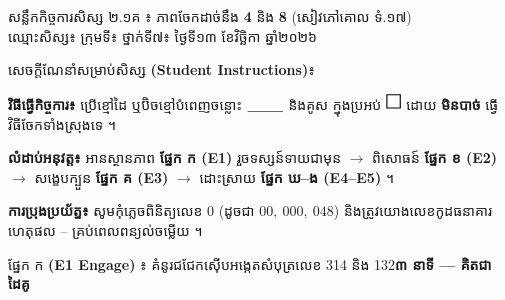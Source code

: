 \documentclass[10pt,a4paper]{article}
\newcommand{\en}[1]{{\LatinFont #1}}
\newcommand{\enbf}[1]{{\LatinFont\textbf{#1}}}
\newcommand{\cnum}[1]{{\fontsize{10pt}{11pt}\selectfont\ding{\numexpr181+#1\relax}}\hspace{0.15em}}
\newcommand{\blank}[1]{\underline{\hspace{#1}}}
\newcommand{\chkbox}{\tikz[baseline=-0.3ex]\draw[black,line width=0.8pt] (0,0) rectangle (0.33,0.33);}
\newcommand{\secbox}[2]{%
  \vspace{6pt}%
  \noindent\begin{tcolorbox}[
    enhanced, sharp corners, boxrule=0.9pt, colframe=black, colback=headband,
    left=7pt, right=7pt, top=4pt, bottom=4pt, boxsep=1pt
  ]
    {\muol\fontsize{9.8pt}{14pt}\selectfont #1}\hfill{\fontsize{9.0pt}{12.5pt}\selectfont\textbf{#2}}
  \end{tcolorbox}%
  \vspace{4pt}%
}
\begin{document}
\fontsize{9.7pt}{14.6pt}\selectfont

\begin{tcolorbox}[
  enhanced, sharp corners, colback=white, colframe=black, boxrule=1.05pt,
  left=8pt, right=8pt, top=5pt, bottom=5pt, boxsep=1pt
]
  {\muol\fontsize{10.5pt}{15pt}\selectfont សន្លឹកកិច្ចការសិស្ស ២.១គ ៖ ភាពចែកដាច់នឹង \enbf{4} និង \enbf{8} (សៀវភៅគោល ទំ.១៧)}\\[4pt]
  ឈ្មោះសិស្ស៖ \blank{5.2cm} \quad ក្រុមទី៖ \blank{1.6cm} \quad ថ្នាក់ទី៧៖ \blank{1.6cm} \quad ថ្ងៃទី១៣ ខែវិច្ឆិកា ឆ្នាំ២០២៦
\end{tcolorbox}

\vspace{5pt}
\begin{tcolorbox}[
  enhanced, sharp corners, colback=panelgray, colframe=black, boxrule=0.85pt,
  left=7pt, right=7pt, top=5pt, bottom=5pt, boxsep=1pt
]
  {\muol\fontsize{9.5pt}{13.8pt}\selectfont សេចក្ដីណែនាំសម្រាប់សិស្ស \enbf{(Student Instructions)}៖}
  \begin{wlist}
    \item \textbf{វិធីធ្វើកិច្ចការ៖} ប្រើខ្មៅដៃ ឬប៊ិចខ្មៅបំពេញចន្លោះ $\blank{0.9cm}$ និងគូស  ក្នុងប្រអប់ $\chkbox$ ដោយ \textbf{មិនបាច់} ធ្វើវិធីចែកទាំងស្រុងទេ ។
    \item \textbf{លំដាប់អនុវត្ត៖} អានស្ថានភាព \textbf{ផ្នែក ក (E1)} រួចទស្សន៍ទាយជាមុន $\to$ ពិសោធន៍ \textbf{ផ្នែក ខ (E2)} $\to$ សង្ខេបក្បួន \textbf{ផ្នែក គ (E3)} $\to$ ដោះស្រាយ \textbf{ផ្នែក ឃ--ង (E4--E5)} ។
    \item \textbf{ការប្រុងប្រយ័ត្ន៖} សូមកុំភ្លេចពិនិត្យលេខ $0$ (ដូចជា $00,\ 000,\ 048$) និងត្រូវយោងលេខកូដធនាគារហេតុផល \cnum{1}--\cnum{4} គ្រប់ពេលពន្យល់ចម្លើយ ។
  \end{wlist}
\end{tcolorbox}

\secbox{ផ្នែក ក \enbf{(E1 Engage)} ៖ គំនូរជជែកស៊ើបអង្កេតសំបុត្រលេខ 314 និង 132}{៣ នាទី \en{---} គិតជាដៃគូ}
\end{document}
